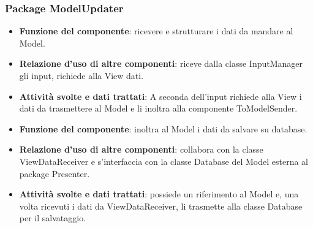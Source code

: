 \documentclass[a4paper,11pt]{article}
\begin{document}
			\subsubsection{Package ModelUpdater}
			\begin{itemize}
				\item\textbf{Funzione del componente}: ricevere e strutturare i dati da mandare al Model.
				\item\textbf{Relazione d'uso di altre componenti}: riceve dalla classe InputManager gli input, richiede alla View dati.
				\item\textbf{Attività svolte e dati trattati}: A seconda dell'input richiede alla View i dati da trasmettere al Model e li inoltra alla componente ToModelSender.
			\end{itemize}
			\begin{itemize}
				\item\textbf{Funzione del componente}: inoltra al Model i dati da salvare su database.
				\item\textbf{Relazione d'uso di altre componenti}: collabora con la classe ViewDataReceiver e s'interfaccia con la classe Database del Model esterna al package Presenter.
				\item\textbf{Attività svolte e dati trattati}: possiede un riferimento al Model e, una volta ricevuti i dati da ViewDataReceiver, li trasmette alla classe Database per il salvataggio.
			\end{itemize}
\end{document}

